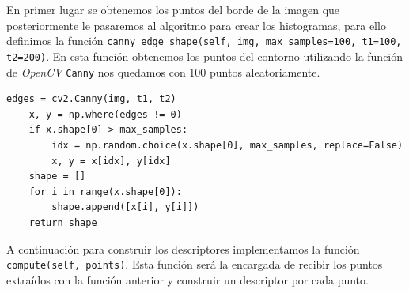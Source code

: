\documentclass[size=a4, parskip=half, titlepage=false, toc=flat, toc=bib, 12pt]{scrartcl}
\begin{document}
En primer lugar se obtenemos los puntos del borde de la imagen que posteriormente le pasaremos al algoritmo para crear los histogramas, para ello definimos la función \verb|canny_edge_shape(self, img, max_samples=100, t1=100, t2=200)|. En esta función obtenemos los puntos del contorno utilizando la función de \textit{OpenCV} \verb|Canny| nos quedamos con 100 puntos aleatoriamente.
\begin{verbatim}
edges = cv2.Canny(img, t1, t2)
    x, y = np.where(edges != 0)
    if x.shape[0] > max_samples:
        idx = np.random.choice(x.shape[0], max_samples, replace=False)
        x, y = x[idx], y[idx]
    shape = []
    for i in range(x.shape[0]):
        shape.append([x[i], y[i]])
    return shape
\end{verbatim}
A continuación para construir los descriptores implementamos la función \verb|compute(self, points)|. Esta función será la encargada de recibir los puntos extraídos con la función anterior y construir un descriptor por cada punto.
\end{document}
